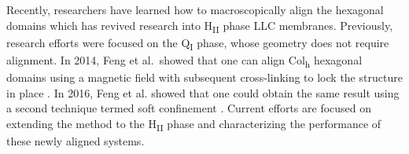 \documentclass[journal=jpcbfk,manusciprt=article]{achemso}
\begin{document}
  Recently, researchers have learned how to macroscopically align the hexagonal
  domains which has revived research into H\textsubscript{II} phase LLC membranes.
  Previously, research efforts were focused on the Q\textsubscript{I} phase,
  whose geometry does not require alignment. In 2014, Feng et al.~showed that one
  can align Col\textsubscript{h} hexagonal domains using a magnetic field with
  subsequent cross-linking to lock the structure in place
  \cite{feng_scalable_2014}. In 2016, Feng et al. showed that one could obtain
  the same result using a second technique termed soft confinement
  \cite{feng_thin_2016}. Current efforts are focused on extending the method to
  the H\textsubscript{II} phase and characterizing the performance of these newly
  aligned systems.


\end{document}
